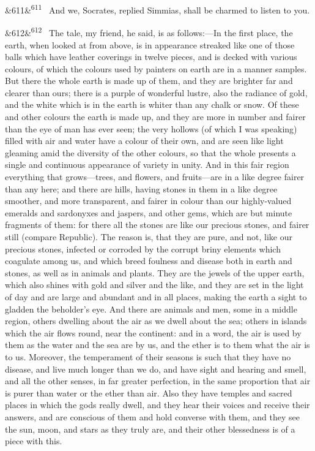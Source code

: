 \documentclass[12pt]{article}
\newcommand{\para}[1][]{\par\noindent\ifx&#1&\else\textsuperscript{\footnotesize #1}~\fi}
\begin{document}
\para[611] And we, Socrates, replied Simmias, shall be charmed to listen to you.

\para[612] The tale, my friend, he said, is as follows:---In the first place, the earth, when looked at from above, is in appearance streaked like one of those balls which have leather coverings in twelve pieces, and is decked with various colours, of which the colours used by painters on earth are in a manner samples. But there the whole earth is made up of them, and they are brighter far and clearer than ours; there is a purple of wonderful lustre, also the radiance of gold, and the white which is in the earth is whiter than any chalk or snow. Of these and other colours the earth is made up, and they are more in number and fairer than the eye of man has ever seen; the very hollows (of which I was speaking) filled with air and water have a colour of their own, and are seen like light gleaming amid the diversity of the other colours, so that the whole presents a single and continuous appearance of variety in unity. And in this fair region everything that grows---trees, and flowers, and fruits---are in a like degree fairer than any here; and there are hills, having stones in them in a like degree smoother, and more transparent, and fairer in colour than our highly-valued emeralds and sardonyxes and jaspers, and other gems, which are but minute fragments of them: for there all the stones are like our precious stones, and fairer still (compare Republic). The reason is, that they are pure, and not, like our precious stones, infected or corroded by the corrupt briny elements which coagulate among us, and which breed foulness and disease both in earth and stones, as well as in animals and plants. They are the jewels of the upper earth, which also shines with gold and silver and the like, and they are set in the light of day and are large and abundant and in all places, making the earth a sight to gladden the beholder's eye. And there are animals and men, some in a middle region, others dwelling about the air as we dwell about the sea; others in islands which the air flows round, near the continent: and in a word, the air is used by them as the water and the sea are by us, and the ether is to them what the air is to us. Moreover, the temperament of their seasons is such that they have no disease, and live much longer than we do, and have sight and hearing and smell, and all the other senses, in far greater perfection, in the same proportion that air is purer than water or the ether than air. Also they have temples and sacred places in which the gods really dwell, and they hear their voices and receive their answers, and are conscious of them and hold converse with them, and they see the sun, moon, and stars as they truly are, and their other blessedness is of a piece with this.
\end{document}

